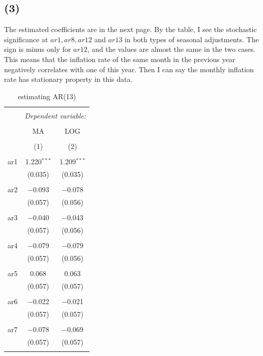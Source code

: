 \documentclass{article}
\begin{document}
\subsection{(3)}
 The estimated coefficients are in the next page. By the table, I see the stochastic significance at $ar1, ar8, ar12$ and $ar13$ in both types of seasonal adjustments. The sign is minus only for $ar12$, and the values are almost the same in the two cases. This means that the inflation rate of the same month in the previous year negatively correlates with one of this year. Then I can say the monthly inflation rate has stationary property in this data.
 \begin{table}[!htbp] \centering 
  \caption{estimating AR(13)} 
  \label{} 
\begin{tabular}{@{\extracolsep{5pt}}lcc} 
\\[-1.8ex]\hline 
\hline \\[-1.8ex] 
 & \multicolumn{2}{c}{\textit{Dependent variable:}} \\ 
\cline{2-3} 
\\[-1.8ex] & MA & LOG \\ 
\\[-1.8ex] & (1) & (2)\\ 
\hline \\[-1.8ex] 
 ar1 & 1.220$^{***}$ & 1.209$^{***}$ \\ 
  & (0.035) & (0.035) \\ 
  & & \\ 
 ar2 & $-$0.093 & $-$0.078 \\ 
  & (0.057) & (0.056) \\ 
  & & \\ 
 ar3 & $-$0.040 & $-$0.043 \\ 
  & (0.057) & (0.056) \\ 
  & & \\ 
 ar4 & $-$0.079 & $-$0.079 \\ 
  & (0.057) & (0.056) \\ 
  & & \\ 
 ar5 & 0.068 & 0.063 \\ 
  & (0.057) & (0.057) \\ 
  & & \\ 
 ar6 & $-$0.022 & $-$0.021 \\ 
  & (0.057) & (0.057) \\ 
  & & \\ 
 ar7 & $-$0.078 & $-$0.069 \\ 
  & (0.057) & (0.057) \\ 
  & & \\ 

\end{tabular}
\end{table}
\end{document}
